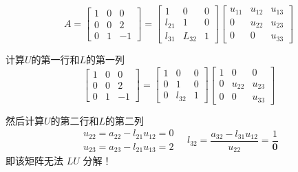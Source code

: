 \begin{example}
    \begin{equation} A=\left[\begin{array}{ccc}1 & 0 & 0 \\ 0 & 0 & 2 \\ 0 & 1 & -1\end{array}\right]=\left[\begin{array}{ccc}1 & 0 & 0 \\ l_{21} & 1 & 0 \\ l_{31} & L_{32} & 1\end{array}\right]\left[\begin{array}{ccc}u_{11} & u_{12} & u_{13} \\ 0 & u_{22} & u_{23} \\ 0 & 0 & u_{33}\end{array}\right] \end{equation}

    计算$U$的第一行和$L$的第一列
    \begin{equation}
        \left[\begin{array}{ccc}
                1 & 0 & 0  \\
                0 & 0 & 2  \\
                0 & 1 & -1
            \end{array}\right]=\left[\begin{array}{ccc}
                1 & 0      & 0 \\
                0 & 1      & 0 \\
                0 & l_{32} & 1
            \end{array}\right]\left[\begin{array}{ccc}
                1 & 0      & 0      \\
                0 & u_{22} & u_{23} \\
                0 & 0      & u_{33}
            \end{array}\right]
    \end{equation}

    然后计算$U$的第二行和$L$的第二列
    \begin{equation}
        \begin{array}{l}
            u_{22}=a_{22}-l_{21} u_{12}=0 \\
            u_{23}=a_{23}-l_{21} u_{13}=2
        \end{array} \quad l_{32}=\frac{a_{32}-l_{31} u_{12}}{u_{22}}=\frac{1}{\boldsymbol{0}}
    \end{equation}
    即该矩阵无法 $ {LU} $ 分解！


\end{example}
